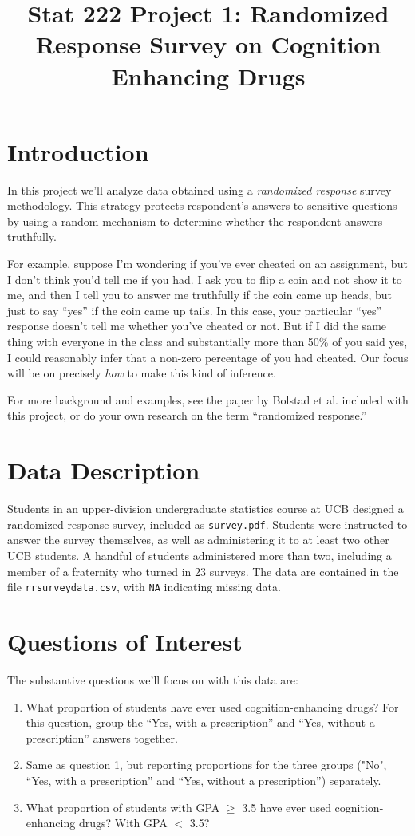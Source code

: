 \documentclass[11pt, oneside]{article}   	%
\title{Stat 222 Project 1: Randomized Response Survey on Cognition Enhancing Drugs}
\date{}							%
\begin{document}
\maketitle

\section{Introduction}

In this project we'll analyze data obtained using a {\em randomized response} survey methodology. This strategy protects respondent's answers to sensitive questions by using a random mechanism to determine whether the respondent answers truthfully. 

For example, suppose I'm wondering if you've ever cheated on an assignment, but I don't think you'd tell me if you had. I ask you to flip a coin and not show it to me, and then I tell you to answer me truthfully if the coin came up heads, but just to say ``yes'' if the coin came up tails. In this case, your particular ``yes'' response doesn't tell me whether you've cheated or not. But if I did the same thing with everyone in the class and substantially more than 50\% of you said yes, I could reasonably infer that a non-zero percentage of you had cheated. Our focus will be on precisely {\em how} to make this kind of inference.

For more background and examples, see the paper by Bolstad et al. included with this project, or do your own research on the term ``randomized response.''

\section{Data Description}

Students in an upper-division undergraduate statistics course at UCB designed a randomized-response survey, included as {\tt survey.pdf}. Students were instructed to answer the survey themselves, as well as administering it to at least two other UCB students. A handful of students administered more than two, including a member of a fraternity who turned in 23 surveys. The data are contained in the file {\tt rrsurveydata.csv}, with {\tt NA} indicating missing data. 

\section{Questions of Interest}

The substantive questions we'll focus on with this data are:
\begin{enumerate}
\item What proportion of students have ever used cognition-enhancing drugs? For this question, group the ``Yes, with a prescription'' and ``Yes, without a prescription'' answers together.
\item Same as question 1, but reporting proportions for the three groups ("No", ``Yes, with a prescription'' and ``Yes, without a prescription'') separately.
\item What proportion of students with GPA $\geq$ 3.5 have ever used cognition-enhancing drugs? With GPA $<$ 3.5?
\end{enumerate}
\end{document}
